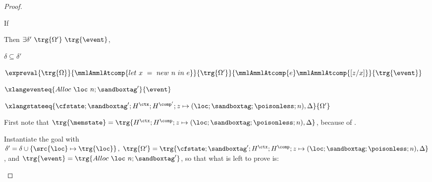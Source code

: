\documentclass[a4paper,names,dvipsnames]{article}
\begin{document}
\begin{proof}
\begin{description}
      If
      Then $\exists\delta'\ \trg{\Omega'}\ \trg{\event}$,
      \begin{goals}
        \item $\delta\subseteq\delta'$
        \item $\expreval{\trg{\Omega}}{\mmlAmmlAtcomp{let\ x\ =\ new\ n\ in\ e}}{\trg{\Omega'}}{\mmlAmmlAtcomp{e}\mmlAmmlAtcomp{[z/x]}}{\trg{\event}}$
        \item $\xlangeventeq{Alloc\ \loc\ n;\sandboxtag'}{\event}$
        \item $\xlangstateeq{\cfstate;\sandboxtag';H^{\ctx};H^{\comp'};z\mapsto(\loc;\sandboxtag;\poisonless;n),\Delta}{\Omega'}$
      \end{goals}
      First note that $\trg{\memstate}=\trg{H^{\ctx};H^{\comp};z\mapsto(\loc;\sandboxtag;\poisonless;n),\Delta}$, because of .

      Instantiate the goal with $\delta'=\delta\cup\left\{\src{\loc}\mapsto\trg{\loc}\right\},\ \trg{\Omega'}=\trg{\cfstate;\sandboxtag';H^{\ctx};H^{\comp};z\mapsto(\loc;\sandboxtag;\poisonless;n),\Delta}$, and $\trg{\event}=\trg{Alloc\ \loc\ n;\sandboxtag'}$, so that what is left to prove is:


\end{description}
\end{proof}
\end{document}
